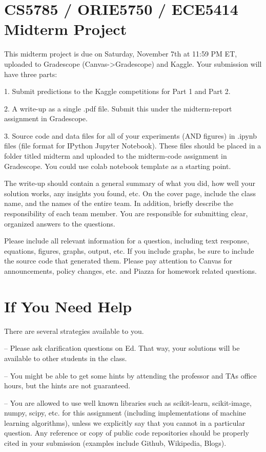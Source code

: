 \documentclass[11pt,letterpaper]{article}
\begin{document}
\section*{CS5785 / ORIE5750 / ECE5414 Midterm Project}

This midterm project is due on Saturday, November 7th at 11:59 PM ET, uploaded to Gradescope
(Canvas->Gradescope) and Kaggle. Your submission will have three parts:

1. Submit predictions to the Kaggle competitions for Part 1 and Part 2.

2. A write-up as a single .pdf file. Submit this under the midterm-report assignment in Gradescope.

3. Source code and data files for all of your experiments (AND figures) in .ipynb files (file format
for IPython Jupyter Notebook). These files should be placed in a folder titled midterm and uploaded
to the midterm-code assignment in Gradescope. You could use colab notebook template as a starting
point.

The write-up should contain a general summary of what you did, how well your solution works, any
insights you found, etc. On the cover page, include the class name, and the names of the entire
team. In addition, briefly describe the responsibility of each team member. You are responsible for
submitting clear, organized answers to the questions.

Please include all relevant information for a question, including text response, equations, figures,
graphs, output, etc. If you include graphs, be sure to include the source code that generated them.
Please pay attention to Canvas for announcements, policy changes, etc. and Piazza for homework
related questions.

\section*{If You Need Help}

There are several strategies available to you.

-- Please ask clarification questions on Ed. That way, your solutions will be available to other
students in the class.

-- You might be able to get some hints by attending the professor and TAs office hours, but the
hints are not guaranteed.

-- You are allowed to use well known libraries such as scikit-learn, scikit-image, numpy, scipy,
etc. for this assignment (including implementations of machine learning algorithms), unless we
explicitly say that you cannot in a particular question. Any reference or copy of public code
repositories should be properly cited in your submission (examples include Github, Wikipedia,
Blogs).
\end{document}
